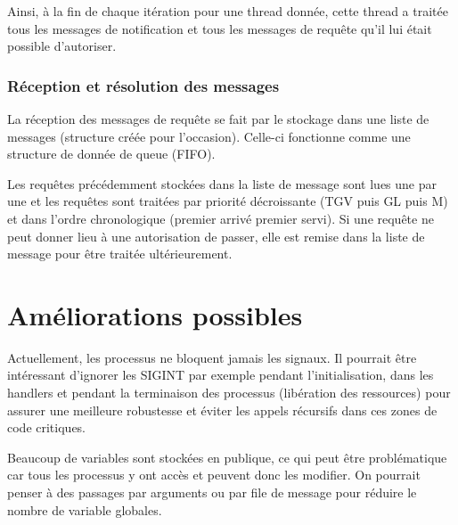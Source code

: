 \documentclass[a4paper,12pt]{article}
\begin{document}
Ainsi, à la fin de chaque itération pour une thread donnée, cette thread a traitée tous les messages de notification et tous les messages de requête qu'il lui était possible d'autoriser.

\subsubsection{Réception et résolution des messages}

La réception des messages de requête se fait par le stockage dans une liste de messages (structure créée pour l'occasion). Celle-ci fonctionne comme une structure de donnée de queue (FIFO).

Les requêtes précédemment stockées dans la liste de message sont lues une par une et les requêtes sont traitées par priorité décroissante (TGV puis GL puis M) et dans l'ordre chronologique (premier arrivé premier servi). Si une requête ne peut donner lieu à une autorisation de passer, elle est remise dans la liste de message pour être traitée ultérieurement.

\section{Améliorations possibles}

Actuellement, les processus ne bloquent jamais les signaux. Il pourrait être intéressant d'ignorer les SIGINT par exemple pendant l'initialisation, dans les handlers  et pendant la terminaison des processus (libération des ressources) pour assurer une meilleure robustesse et éviter les appels récursifs dans ces zones de code critiques.

Beaucoup de variables sont stockées en publique, ce qui peut être problématique car tous les processus y ont accès et peuvent donc les modifier. On pourrait penser à des passages par arguments ou par file de message pour réduire le nombre de variable globales.
\end{document}
